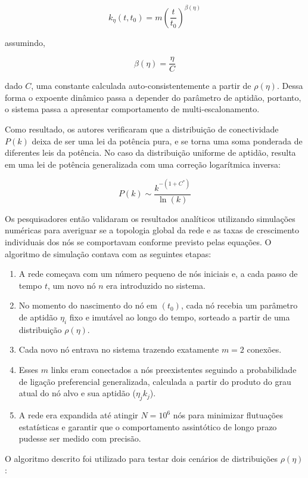 \documentclass[12pt,oneside,a4paper,brazil,sumario=tradicional]{abntex2}
\begin{document}
\[k_{\eta}(t,t_{0}) = m\left(\frac{t}{t_{0}}\right)^{\beta(\eta)}\]

assumindo,

\[\beta(\eta) = \frac{\eta}{C}\]

dado $C$, uma constante calculada auto-consistentemente a partir de $\rho(\eta)$. Dessa forma o expoente dinâmico passa a depender do parâmetro de aptidão, portanto, o sistema passa a apresentar comportamento de multi-escalonamento.

Como resultado, os autores verificaram que a distribuição de conectividade $P(k)$ deixa de ser uma lei da potência pura, e se torna uma soma ponderada de diferentes leis da potência. No caso da distribuição uniforme de aptidão, resulta em uma lei de potência generalizada com uma correção logarítmica inversa:

\[P(k) \sim \frac{k^{-(1+C^{*})}}{\ln(k)}\]

Os pesquisadores então validaram os resultados analíticos utilizando simulações numéricas para averiguar se a topologia global da rede e as taxas de crescimento individuais dos nós se comportavam conforme previsto pelas equações. O algoritmo de simulação contava com as seguintes etapas:

\begin{enumerate}
  \item A rede começava com um número pequeno de nós iniciais e, a cada passo de tempo $t$, um novo nó $n$ era introduzido no sistema.
  \item No momento do nascimento do nó em $(t_{0})$, cada nó recebia um parâmetro de aptidão $\eta_{i}$ fixo e imutável ao longo do tempo, sorteado a partir de uma distribuição $\rho(\eta)$.
  \item Cada novo nó entrava no sistema trazendo exatamente $m = 2$ conexões.
  \item Esses $m$ links eram conectados a nós preexistentes seguindo a probabilidade de ligação preferencial generalizada, calculada a partir do produto do grau atual do nó alvo e sua aptidão ($\eta_{j}k_{j}$).
  \item A rede era expandida até atingir $N = 10^{6}$ nós para minimizar flutuações estatísticas e garantir que o comportamento assintótico de longo prazo pudesse ser medido com precisão.
\end{enumerate}
O algoritmo descrito foi utilizado para testar dois cenários de distribuições $\rho(\eta)$:
\end{document}
